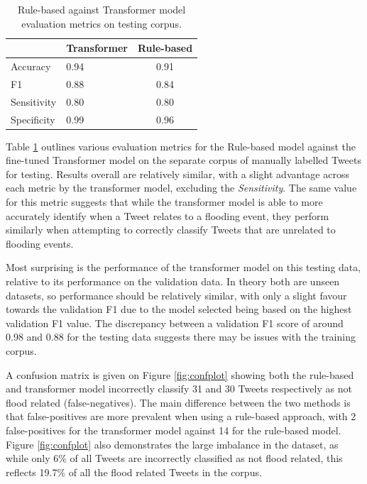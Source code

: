 \documentclass[a4paper, notitlepage]{extreport}
\begin{document}
\begin{table}

\caption{\label{tab:evaltable}Rule-based against Transformer model evaluation metrics on testing corpus.}
\centering
\fontsize{9}{11}\selectfont
\begin{tabular}[t]{llc}
\toprule
\textbf{ } & \textbf{Transformer} & \textbf{Rule-based}\\
\midrule
Accuracy & 0.94 & 0.91\\
F1 & 0.88 & 0.84\\
Sensitivity & 0.80 & 0.80\\
Specificity & 0.99 & 0.96\\
\bottomrule
\end{tabular}
\end{table}

Table \ref{tab:evaltable} outlines various evaluation metrics for the
Rule-based model against the fine-tuned Transformer model on the
separate corpus of manually labelled Tweets for testing. Results overall
are relatively similar, with a slight advantage across each metric by
the transformer model, excluding the \emph{Sensitivity}. The same value
for this metric suggests that while the transformer model is able to
more accurately identify when a Tweet relates to a flooding event, they
perform similarly when attempting to correctly classify Tweets that are
unrelated to flooding events.

Most surprising is the performance of the transformer model on this
testing data, relative to its performance on the validation data. In
theory both are unseen datasets, so performance should be relatively
similar, with only a slight favour towards the validation F1 due to the
model selected being based on the highest validation F1 value. The
discrepancy between a validation F1 score of around 0.98 and 0.88 for
the testing data suggests there may be issues with the training corpus.

A confusion matrix is given on Figure \ref{fig:confplot} showing both
the rule-based and transformer model incorrectly classify 31 and 30
Tweets respectively as not flood related (false-negatives). The main
difference between the two methods is that false-positives are more
prevalent when using a rule-based approach, with 2 false-positives for
the transformer model against 14 for the rule-based model. Figure
\ref{fig:confplot} also demonstrates the large imbalance in the dataset,
as while only 6\% of all Tweets are incorrectly classified as not flood
related, this reflects 19.7\% of all the flood related Tweets in the
corpus.
\end{document}
